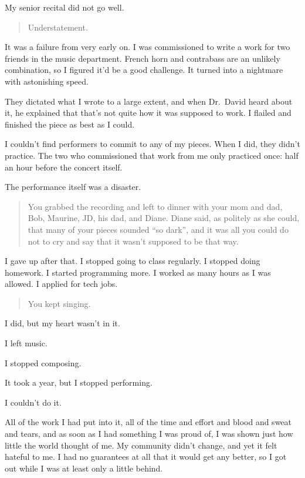 My senior recital did not go well.

\begin{quote}
Understatement.
\end{quote}

It was a failure from very early on. I was commissioned to write a work for two friends in the music department. French horn and contrabass are an unlikely combination, so I figured it'd be a good challenge. It turned into a nightmare with astonishing speed.

They dictated what I wrote to a large extent, and when Dr.~David heard about it, he explained that that's not quite how it was supposed to work. I flailed and finished the piece as best as I could.

I couldn't find performers to commit to any of my pieces. When I did, they didn't practice. The two who commissioned that work from me only practiced once: half an hour before the concert itself.

The performance itself was a disaster.

\begin{quote}
You grabbed the recording and left to dinner with your mom and dad, Bob, Maurine, JD, his dad, and Diane. Diane said, as politely as she could, that many of your pieces sounded ``so dark'', and it was all you could do not to cry and say that it wasn't supposed to be that way.
\end{quote}

I gave up after that. I stopped going to class regularly. I stopped doing homework. I started programming more. I worked as many hours as I was allowed. I applied for tech jobs.

\begin{quote}
You kept singing.
\end{quote}

I did, but my heart wasn't in it.

I left music.

I stopped composing.

It took a year, but I stopped performing.

I couldn't do it.

All of the work I had put into it, all of the time and effort and blood and sweat and tears, and as soon as I had something I was proud of, I was shown just how little the world thought of me. My community didn't change, and yet it felt hateful to me. I had no guarantees at all that it would get any better, so I got out while I was at least only a little behind.

